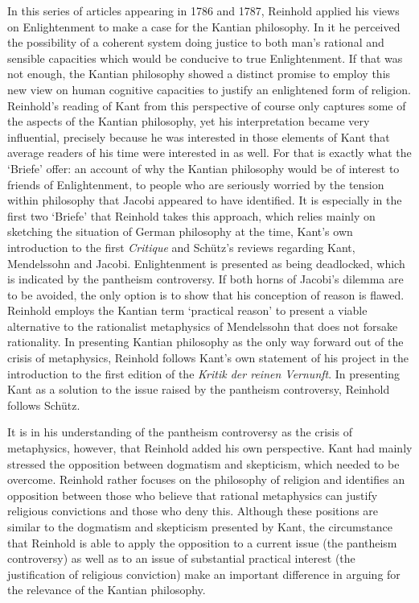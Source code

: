  In this series of articles appearing in 1786 and 1787, Reinhold applied his views on Enlightenment to make a case for the Kantian philosophy. In it he perceived the possibility of a coherent system doing justice to both man's rational and sensible capacities which would be conducive to true Enlightenment. If that was not enough, the Kantian philosophy showed a distinct promise to employ this new view on human cognitive capacities to justify an enlightened form of religion. Reinhold's reading of Kant from this perspective of course only captures some of the aspects of the Kantian philosophy, yet his interpretation became very influential, precisely because he was interested in those elements of Kant that average readers of his time were interested in as well. For that is exactly what the `Briefe' offer: an account of why the Kantian philosophy would be of interest to friends of Enlightenment, to people who are seriously worried by the tension within philosophy that Jacobi appeared to have identified. It is especially in the first two `Briefe' that Reinhold takes this approach, which relies mainly on sketching the situation of German philosophy at the time, Kant's own introduction to the first \textit{Critique }and Sch\"{u}tz's reviews regarding Kant, Mendelssohn and Jacobi. Enlightenment is presented as being deadlocked, which is indicated by the pantheism controversy. If both horns of Jacobi's dilemma are to be avoided, the only option is to show that his conception of reason is flawed. Reinhold employs the Kantian term `practical reason' to present a viable alternative to the rationalist metaphysics of Mendelssohn that does not forsake rationality. In presenting Kantian philosophy as the only way forward out of the crisis of metaphysics, Reinhold follows Kant's own statement of his project in the introduction to the first edition of the \textit{Kritik der reinen Vernunft}. In presenting Kant as a solution to the issue raised by the pantheism controversy, Reinhold follows Sch\"{u}tz. 

It is in his understanding of the pantheism controversy as the crisis of metaphysics, however, that Reinhold added his own perspective. Kant had mainly stressed the opposition between dogmatism and skepticism, which needed to be overcome. Reinhold rather focuses on the philosophy of religion and identifies an opposition between those who believe that rational metaphysics can justify religious convictions and those who deny this. Although these positions are similar to the dogmatism and skepticism presented by Kant, the circumstance that Reinhold is able to apply the opposition to a current issue (the pantheism controversy) as well as to an issue of substantial practical interest (the justification of religious conviction) make an important difference in arguing for the relevance of the Kantian philosophy.

